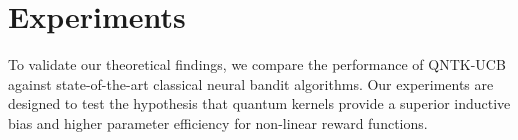 \documentclass[pdflatex,sn-mathphys-num]{sn-jnl}%
\theoremstyle{thmstyleone}%
\theoremstyle{thmstyletwo}%
\theoremstyle{thmstylethree}%
\begin{document}




























\section{Experiments}
To validate our theoretical findings, we compare the performance of QNTK-UCB against state-of-the-art classical neural bandit algorithms. Our experiments are designed to test the hypothesis that quantum kernels provide a superior inductive bias and higher parameter efficiency for non-linear reward functions.
\end{document}
